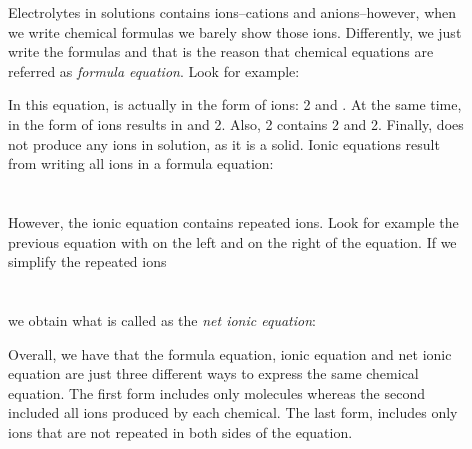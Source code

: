 \documentclass[main.tex]{subfiles} %
\begin{document}
\begin{description}
\item[] Electrolytes in solutions contains ions--cations and anions--however, when we write chemical formulas we barely show those ions. Differently, we just write the formulas and that is the reason that chemical equations are referred as \emph{formula equation}. Look for example:
\begin{center}\end{center}
In this equation,  is actually in the form of ions: 2 and . At the same time,  in the form of ions results in  and 2. Also, 2 contains 2 and 2. Finally,  does not produce any ions in solution, as it is a solid.
Ionic equations result from writing all ions in a formula equation:
\\
{\raggedleft {} }  \\ 
\hspace*{\fill}
 \\
However, the ionic equation contains repeated ions. Look for example the previous equation with  on the left and on the right of the equation. If we simplify the repeated ions \\
{\raggedleft {} }  \\ 
\hspace*{\fill}
\\ 
we obtain what is called as the \emph{net ionic equation}:
\begin{center}  \end{center}
Overall, we have that the formula equation, ionic equation and net ionic equation are just three different ways to express the same chemical equation. The first form includes only molecules whereas the second included all ions produced by each chemical. The last form, includes only ions that are not repeated in both sides of the equation.


\end{description}
\end{document}
